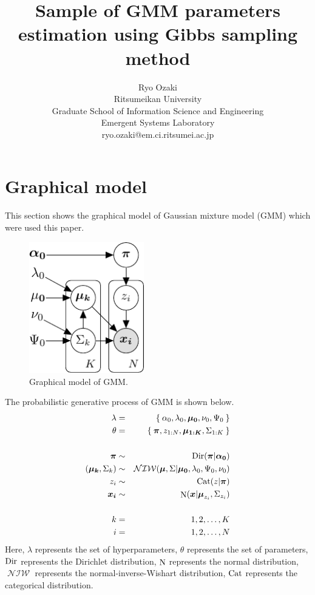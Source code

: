 \documentclass[a4paper]{article}
\title{Sample of GMM parameters estimation using Gibbs sampling method}
\author{
	Ryo Ozaki\\
	Ritsumeikan University\\
	Graduate School of Information Science and Engineering\\
	Emergent Systems Laboratory\\
	ryo.ozaki@em.ci.ritsumei.ac.jp
}
\DeclareMathOperator{\Cat}{\rm Cat}
\DeclareMathOperator{\Dir}{\rm Dir}
\DeclareMathOperator{\N}{\rm N}
\DeclareMathOperator{\NIW}{\mathcal{NIW}}
\begin{document}
	\maketitle
	\section{Graphical model}
	This section shows the graphical model of Gaussian mixture model (GMM) which were used this paper.
	\begin{figure}[ht]
		\begin{center}
			\includegraphics[width=5cm]{fig/GMM_graphical_model.pdf}
			\caption{Graphical model of GMM.}
		\end{center}
	\end{figure}

	The probabilistic generative process of GMM is shown below.
	\begin{eqnarray}
		\lambda &=& \Set{\alpha_0, \lambda_0, \boldsymbol{\mu_0}, \nu_0, \Psi_0}\\
		\theta &=& \Set{\boldsymbol{\pi}, z_{1:N}, \boldsymbol{\mu_{1:K}}, \Sigma_{1:K}}\\
		\nonumber \\
		\boldsymbol{\pi} &\sim& \Dir(\boldsymbol{\pi} | \boldsymbol{\alpha_0})\\
		(\boldsymbol{\mu_k}, \Sigma_k) &\sim& \NIW(\boldsymbol{\mu}, \Sigma | \boldsymbol{\mu_0}, \lambda_0, \Psi_0, \nu_0) \\
		z_i &\sim& \Cat(z | \boldsymbol{\pi}) \\
		\boldsymbol{x_i} &\sim& \N(\boldsymbol{x} | \boldsymbol{\mu}_{z_i}, \Sigma_{z_i})\\
		\nonumber \\
		k &=& 1, 2, \ldots, K\\
		i &=& 1, 2, \ldots, N
	\end{eqnarray}
	Here, $\lambda$ represents the set of hyperparameters, $\theta$ represents the set of parameters, $\Dir$ represents the Dirichlet distribution, $\N$ represents the normal distribution, $\NIW$ represents the normal-inverse-Wishart distribution, $\Cat$ represents the categorical distribution.
\end{document}
